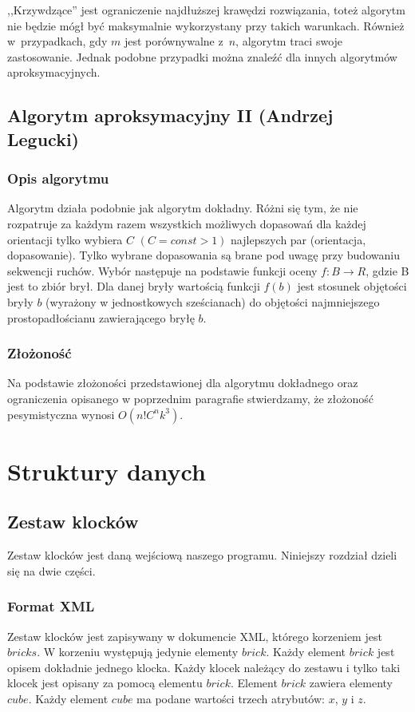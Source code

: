 \documentclass[12pt]{article}
\begin{document}
,,Krzywdzące'' jest ograniczenie najdłuższej krawędzi rozwiązania, toteż
algorytm nie będzie mógł być maksymalnie wykorzystany przy takich
warunkach. Również w~przypadkach, gdy $m$ jest porównywalne z~$n$,
algorytm traci swoje zastosowanie. Jednak podobne przypadki można znaleźć
dla innych algorytmów aproksymacyjnych.

\subsection{Algorytm aproksymacyjny II (Andrzej Legucki)}
\subsubsection{Opis algorytmu}
Algorytm działa podobnie jak algorytm dokładny. Różni się tym, że nie rozpatruje za każdym razem wszystkich
możliwych dopasowań dla każdej orientacji tylko wybiera  $C$ $(C=const > 1)$ najlepszych par (orientacja, dopasowanie).
Tylko wybrane dopasowania są brane pod uwagę przy budowaniu sekwencji ruchów. Wybór następuje na podstawie funkcji 
oceny $f: B \rightarrow R$, gdzie B jest to zbiór brył. Dla danej bryły wartością funkcji $f(b)$ jest stosunek objętości
bryły $b$ (wyrażony w jednostkowych sześcianach) do objętości najmniejszego prostopadłościanu zawierającego bryłę $b$.
\subsubsection{Złożoność}
Na podstawie złożoności przedstawionej dla algorytmu dokładnego oraz ograniczenia opisanego w poprzednim 
paragrafie stwierdzamy, że złożoność pesymistyczna wynosi $O(n!C^nk^3)$.


\section{Struktury danych}

\subsection{Zestaw klocków}
Zestaw klocków jest daną wejściową naszego programu. Niniejszy rozdział
dzieli się na dwie części.

\subsubsection{Format XML}\label{sec:zapis}
Zestaw klocków jest zapisywany w dokumencie XML, którego korzeniem jest
$bricks$. W korzeniu występują jedynie elementy $brick$. Każdy element
$brick$ jest opisem dokładnie jednego klocka. Każdy klocek należący do
zestawu i tylko taki klocek jest opisany za pomocą elementu $brick$.
Element $brick$ zawiera elementy $cube$. Każdy element $cube$ ma podane
wartości trzech atrybutów: $x$, $y$ i $z$.
\end{document}
